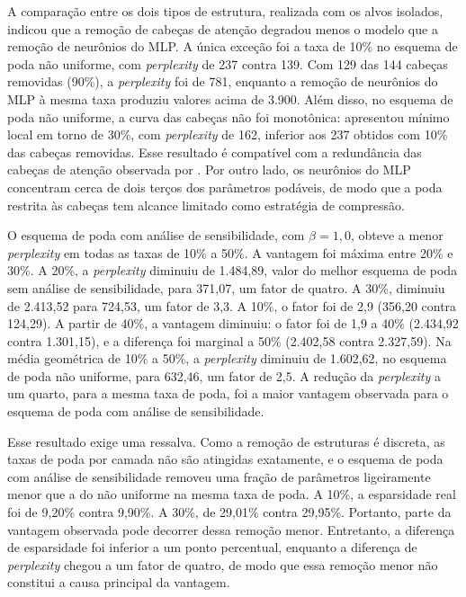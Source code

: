 A comparação entre os dois tipos de estrutura, realizada com os alvos isolados, indicou que a
remoção de cabeças de atenção degradou menos o modelo que a remoção de neurônios do MLP. A
única exceção foi a taxa de 10\% no esquema de poda não uniforme, com \textit{perplexity} de
237 contra 139. Com 129 das 144 cabeças removidas (90\%), a \textit{perplexity} foi de 781,
enquanto a remoção de neurônios do MLP à mesma taxa produziu valores acima de 3.900. Além
disso, no esquema de poda não uniforme, a curva das cabeças não foi monotônica: apresentou
mínimo local em torno de 30\%, com \textit{perplexity} de 162, inferior aos 237 obtidos com
10\% das cabeças removidas. Esse resultado é compatível com a redundância das cabeças de
atenção observada por . Por outro lado, os neurônios do MLP concentram
cerca de dois terços dos parâmetros podáveis, de modo
que a poda restrita às cabeças tem alcance limitado como estratégia de compressão.

O esquema de poda com análise de sensibilidade, com $\beta = 1{,}0$, obteve a menor
\textit{perplexity} em todas as taxas de 10\% a 50\%. A vantagem foi máxima entre 20\% e 30\%.
A 20\%, a \textit{perplexity} diminuiu de 1.484,89, valor do melhor esquema de poda sem análise
de sensibilidade, para 371,07, um fator de quatro. A 30\%, diminuiu de 2.413,52 para 724,53, um
fator de 3,3. A 10\%, o fator foi de 2,9 (356,20 contra 124,29). A partir de 40\%, a vantagem
diminuiu: o fator foi de 1,9 a 40\% (2.434,92 contra 1.301,15), e a diferença foi marginal a
50\% (2.402,58 contra 2.327,59). Na média geométrica de 10\% a 50\%, a \textit{perplexity}
diminuiu de 1.602,62, no esquema de poda não uniforme, para 632,46, um fator de 2,5. A redução
da \textit{perplexity} a um quarto, para a mesma taxa de poda, foi a maior vantagem observada
para o esquema de poda com análise de sensibilidade.

Esse resultado exige uma ressalva. Como a remoção de estruturas é discreta, as taxas de poda
por camada não são atingidas exatamente, e o esquema de
poda com análise de sensibilidade removeu uma fração de parâmetros ligeiramente menor que a do
não uniforme na mesma taxa de poda. A 10\%, a esparsidade real foi de 9,20\% contra 9,90\%. A
30\%, de 29,01\% contra 29,95\%. Portanto, parte da vantagem observada pode decorrer dessa
remoção menor. Entretanto, a diferença de esparsidade foi inferior a um ponto percentual,
enquanto a diferença de \textit{perplexity} chegou a um fator de quatro, de modo que essa
remoção menor não constitui a causa principal da vantagem.

